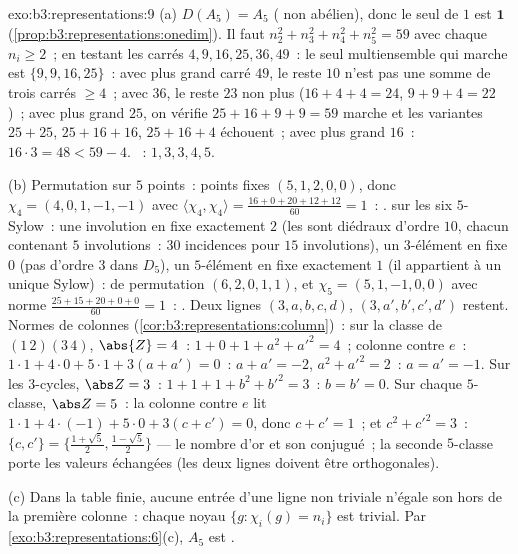 \begin{solution}{exo:b3:representations:9}
(a) $D(A_5) = A_5$ ( non abélien), donc le seul 
de  $1$ est $\mathbf 1$
(\cref{prop:b3:representations:onedim}). Il faut $n_2^2 + n_3^2
+ n_4^2 + n_5^2 = 59$ avec chaque $n_i \geq 2$~; en testant les
carrés $4, 9, 16, 25, 36, 49$~: le seul multiensemble qui
marche est $\{9, 9, 16, 25\}$~: avec plus grand carré $49$, le
reste $10$ n'est pas une somme de trois carrés $\geq 4$~; avec
$36$, le reste $23$ non plus ($16 + 4 + 4 = 24$, $9 + 9 + 4 =
22$)~; avec plus grand $25$, on vérifie $25 + 16 + 9 + 9 = 59$
marche et les variantes $25 + 25$, $25 + 16 + 16$, $25 + 16 +
4$ échouent~; avec plus grand $16$~: $16\cdot3 = 48 < 59 - 4$.
~: $1, 3, 3, 4, 5$.

(b) Permutation sur $5$ points~: points fixes $(5, 1, 2, 0,
0)$, donc $\chi_4 = (4, 0, 1, -1, -1)$ avec
$\langle\chi_4,\chi_4\rangle = \frac{16 + 0 + 20 + 12 + 12}{60}
= 1$~: .  sur les six $5$-Sylow~: une
involution en fixe exactement $2$ (les  sont
diédraux d'ordre $10$, chacun contenant $5$ involutions~: $30$
incidences pour $15$ involutions), un $3$-élément en fixe $0$
(pas d'ordre $3$ dans $D_5$), un $5$-élément en fixe
exactement $1$ (il appartient à un unique Sylow)~:  de
permutation $(6, 2, 0, 1, 1)$, et $\chi_5 = (5, 1, -1, 0, 0)$
avec norme $\frac{25 + 15 + 20 + 0 + 0}{60} = 1$~:
. Deux lignes $(3, a, b, c, d)$, $(3, a', b', c',
d')$ restent. Normes de colonnes
(\cref{cor:b3:representations:column})~: sur la classe de
$(1\,2)(3\,4)$, $\abs{Z} = 4$~: $1 + 0 + 1 + a^2 + a'^2 = 4$~;
colonne contre $e$~: $1\cdot1 + 4\cdot 0 + 5\cdot1 + 3(a + a')
= 0$~: $a + a' = -2$, $a^2 + a'^2 = 2$~: $a = a' = -1$. Sur les
$3$-cycles, $\abs Z = 3$~: $1 + 1 + 1 + b^2 + b'^2 = 3$~: $b =
b' = 0$. Sur chaque $5$-classe, $\abs Z = 5$~: la colonne
contre $e$ lit $1\cdot 1 + 4\cdot(-1) + 5\cdot 0 + 3(c + c') =
0$, donc $c + c' = 1$~; et $c^2 + c'^2 = 3$~: $\{c, c'\} =
\bigl\{\frac{1+\sqrt5}2, \frac{1-\sqrt5}2\bigr\}$ --- le nombre
d'or et son conjugué~; la seconde $5$-classe porte les valeurs
échangées (les deux lignes doivent être orthogonales).

(c) Dans la table finie, aucune entrée d'une ligne non triviale
n'égale son  hors de la première colonne~: chaque noyau
$\{g : \chi_i(g) = n_i\}$ est trivial. Par
\cref{exo:b3:representations:6}(c), $A_5$ est .
\end{solution}

